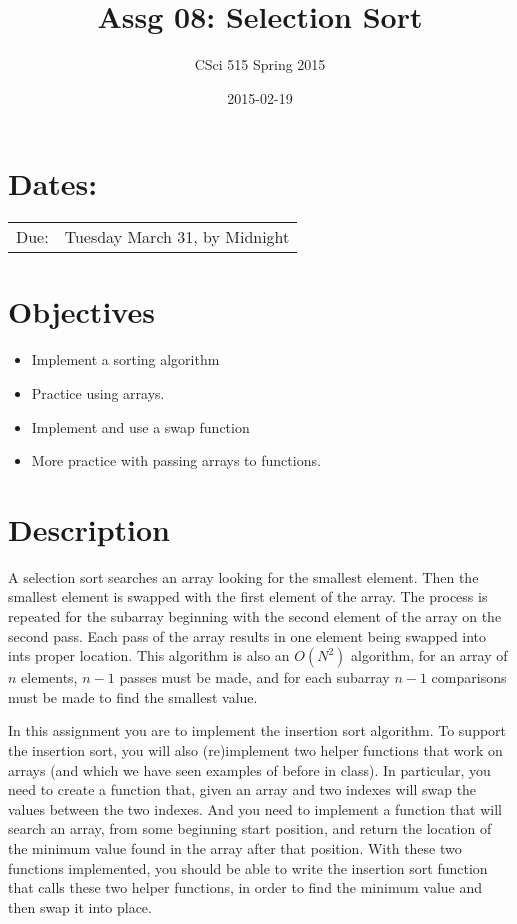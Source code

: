 \documentclass[11pt]{article}
\title{Assg 08: Selection Sort}
\author{CSci 515 Spring 2015}
\date{2015-02-19}
\begin{document}
\maketitle


\section*{Dates:}
\label{sec-1}


\begin{center}
\begin{tabular}{ll}
 Due:  &  Tuesday March 31, by Midnight  \\
\end{tabular}
\end{center}
\section*{Objectives}
\label{sec-2}

\begin{itemize}
\item Implement a sorting algorithm
\item Practice using arrays.
\item Implement and use a swap function
\item More practice with passing arrays to functions.
\end{itemize}
\section*{Description}
\label{sec-3}

A selection sort searches an array looking for the smallest element.
Then the smallest element is swapped with the first element of the
array.  The process is repeated for the subarray beginning with the
second element of the array on the second pass.  Each pass of the
array results in one element being swapped into ints proper location.
This algorithm is also an $O(N^2)$ algorithm, for an array of $n$
elements, $n - 1$ passes must be made, and for each subarray $n - 1$
comparisons must be made to find the smallest value.

In this assignment you are to implement the insertion sort algorithm.
To support the insertion sort, you will also (re)implement two helper
functions that work on arrays (and which we have seen examples of
before in class).  In particular, you need to create a function that,
given an array and two indexes will swap the values between the two
indexes.  And you need to implement a function that will search an
array, from some beginning start position, and return the location of
the minimum value found in the array after that position.  With these
two functions implemented, you should be able to write the insertion
sort function that calls these two helper functions, in order to find
the minimum value and then swap it into place.
\end{document}
